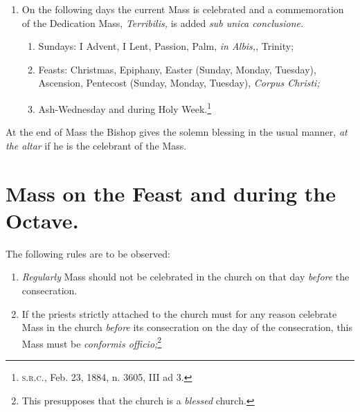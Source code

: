 \documentclass[letterpaper]{report}
\newcommand\src{\textsc{s.r.c.}}
\begin{document}
{\begin{enumerate}[label=(\Roman*)]
\begin{enumerate}[label=(\arabic*)]
            \item During the octaves of Epiphany, of Easter \textit{from
                Wednesday to Saturday,} of Pentecost \textit{from Wednesday to
                Saturday;}

            \item Vigils of Christmas and Pentecost.

        \end{enumerate}

    \item On the following days the current Mass is celebrated and a
        commemoration of the Dedication Mass, \textit{Terribilis,} is added
        \textit{sub unica conclusione.}

        \begin{enumerate}[label=(\arabic*)]

            \item Sundays: I Advent, I Lent, Passion, Palm, \textit{in Albis,},
                Trinity;

            \item Feasts: Christmas, Epiphany, Easter (Sunday, Monday,
                Tuesday), Ascension, Pentecost (Sunday, Monday, Tuesday),
                \textit{Corpus Christi;}

            \item Ash-Wednesday and during Holy Week.\footnote{\src, Feb. 23,
                1884, n. 3605, III ad 3.}

        \end{enumerate}

\end{enumerate}

\rubric At the end of Mass the Bishop gives the solemn blessing in the usual
manner, \textit{at the altar} if he is the celebrant of the Mass.

\section{Mass on the Feast and during the Octave.}

\rubric The following rules are to be observed:

\begin{enumerate}

    \item \textit{Regularly} Mass should not be celebrated in the church on
        that day \textit{before} the consecration.
    
    \item If the priests strictly attached to the church must for any reason
        celebrate Mass in the church \textit{before} its consecration on the
        day of the consecration, this Mass must be \textit{conformis
        officio;}\footnote{This presupposes that the church is a
        \textit{blessed} church.}


\end{enumerate}}
\end{document}
